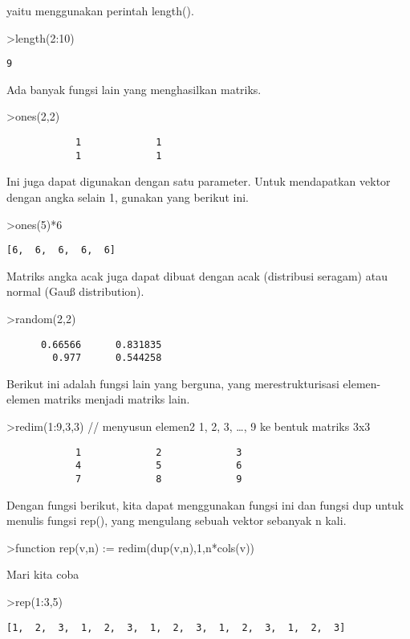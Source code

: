 \documentclass[
]{book}
\begin{document}
yaitu menggunakan perintah length().

\textgreater length(2:10)

\begin{verbatim}
9
\end{verbatim}

Ada banyak fungsi lain yang menghasilkan matriks.

\textgreater ones(2,2)

\begin{verbatim}
            1             1 
            1             1 
\end{verbatim}

Ini juga dapat digunakan dengan satu parameter. Untuk mendapatkan vektor dengan angka selain 1, gunakan yang berikut ini.

\textgreater ones(5)*6

\begin{verbatim}
[6,  6,  6,  6,  6]
\end{verbatim}

Matriks angka acak juga dapat dibuat dengan acak (distribusi seragam) atau normal (Gauß distribution).

\textgreater random(2,2)

\begin{verbatim}
      0.66566      0.831835 
        0.977      0.544258 
\end{verbatim}

Berikut ini adalah fungsi lain yang berguna, yang merestrukturisasi elemen-elemen matriks menjadi matriks lain.

\textgreater redim(1:9,3,3) // menyusun elemen2 1, 2, 3, \ldots, 9 ke bentuk matriks 3x3

\begin{verbatim}
            1             2             3 
            4             5             6 
            7             8             9 
\end{verbatim}

Dengan fungsi berikut, kita dapat menggunakan fungsi ini dan fungsi dup untuk menulis fungsi rep(), yang mengulang sebuah vektor sebanyak n kali.

\textgreater function rep(v,n) := redim(dup(v,n),1,n*cols(v))

Mari kita coba

\textgreater rep(1:3,5)

\begin{verbatim}
[1,  2,  3,  1,  2,  3,  1,  2,  3,  1,  2,  3,  1,  2,  3]
\end{verbatim}
\end{document}
